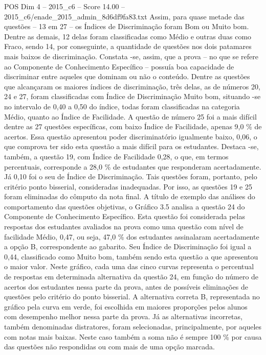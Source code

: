 \begin{textsample}{POS Dim 4 – 2015\_c6 – Score 14.00 – 2015\_c6/enade\_2015\_admin\_8d6df9fa83.txt}
Assim, para quase metade das questões – 13 em 27 – os Índices de Discriminação foram Bom ou Muito bom.
Dentre as demais, 12 delas foram classificadas como Médio e outras duas como Fraco, sendo 14, por conseguinte, a quantidade de questões nos dois patamares mais baixos de discriminação.
Constata -se, assim, que a prova – no que se refere ao Componente de Conhecimento Específico – possuía boa capacidade de discriminar entre aqueles que dominam ou não o conteúdo.
Dentre as questões que alcançaram os maiores índices de discriminação, três delas, as de números 20, 24 e 27, foram classificadas com Índice de Discriminação Muito bom, situando -se no intervalo de 0,40 a 0,50 do índice, todas foram classificadas na categoria Médio, quanto ao Índice de Facilidade.
A questão de número 25 foi a mais difícil dentre as 27 questões específicas, com baixo Índice de Facilidade, apenas 9,0 \% de acertos.
Essa questão apresentou poder discriminatório igualmente baixo, 0,06, o que comprova ter sido esta questão a mais difícil para os estudantes.
Destaca -se, também, a questão 19, com Índice de Facilidade 0,28, o que, em termos percentuais, corresponde a 28,0 \% de estudantes que responderam acertadamente.
Já 0,10 foi o seu de Índice de Discriminação.
Tais questões foram, portanto, pelo critério ponto bisserial, consideradas inadequadas.
Por isso, as questões 19 e 25 foram eliminadas do cômputo da nota final.
A título de exemplo das análises do comportamento das questões objetivas, o Gráfico 3.5 analisa a questão 24 do Componente de Conhecimento Específico.
Esta questão foi considerada pelas respostas dos estudantes avaliados na prova como uma questão com nível de facilidade Médio, 0,47, ou seja, 47,0 \% dos estudantes assinalaram acertadamente a opção B, correspondente ao gabarito.
Seu Índice de Discriminação foi igual a 0,44, classificado como Muito bom, também sendo esta questão a que apresentou o maior valor.
Neste gráfico, cada uma das cinco curvas representa o percentual de respostas em determinada alternativa da questão 24, em função do número de acertos dos estudantes nessa parte da prova, antes de possíveis eliminações de questões pelo critério do ponto bisserial.
A alternativa correta B, representada no gráfico pela curva em verde, foi escolhida em maiores proporções pelos alunos com desempenho melhor nessa parte da prova.
Já as alternativas incorretas, também denominadas distratores, foram selecionadas, principalmente, por aqueles com notas mais baixas.
Neste caso também a soma não é sempre 100 \% por causa das questões não respondidas ou com mais de uma opção marcada.

\end{textsample}

